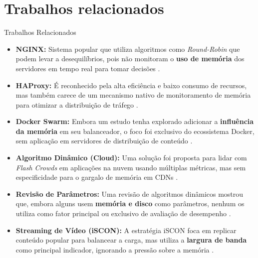 \documentclass[10pt]{beamer}
\begin{document}

\section{Trabalhos relacionados}

\begin{frame}[allowframebreaks]{Trabalhos Relacionados}

\begin{itemize}
    \item \textbf{NGINX:} Sistema popular que utiliza algoritmos como \textit{Round-Robin} que podem levar a desequilíbrios, pois não monitoram o \textbf{uso de memória} dos servidores em tempo real para tomar decisões \cite{nginxAlgorithmsEvaluationYuhong2022}.

    \item \textbf{HAProxy:} É reconhecido pela alta eficiência e baixo consumo de recursos, mas também carece de um mecanismo nativo de monitoramento de memória para otimizar a distribuição de tráfego \cite{haproxy}.

    \item \textbf{Docker Swarm:} Embora um estudo tenha explorado adicionar a \textbf{influência da memória} em seu balanceador, o foco foi exclusivo do ecossistema Docker, sem aplicação em servidores de distribuição de conteúdo \cite{dockerswarmmemory2018}.

    \item \textbf{Algoritmo Dinâmico (Cloud):} Uma solução foi proposta para lidar com \textit{Flash Crowds} em aplicações na nuvem usando múltiplas métricas, mas sem especificidade para o gargalo de memória em CDNs \cite{novelWeightAssignmentLoadBalancingAlgorithmForCloudApps2023}.
    
    \item \textbf{Revisão de Parâmetros:} Uma revisão de algoritmos dinâmicos mostrou que, embora alguns usem \textbf{memória e disco} como parâmetros, nenhum os utiliza como fator principal ou exclusivo de avaliação de desempenho \cite{webServerPerformanceImprovement2021Review}.
    
    \item \textbf{Streaming de Vídeo (iSCON):} A estratégia iSCON foca em replicar conteúdo popular para balancear a carga, mas utiliza a \textbf{largura de banda} como principal indicador, ignorando a pressão sobre a memória \cite{dynamicLoadBalancingForEfficientVideoStreamingService2015}.
    

\end{itemize}
\end{frame}
\end{document}
